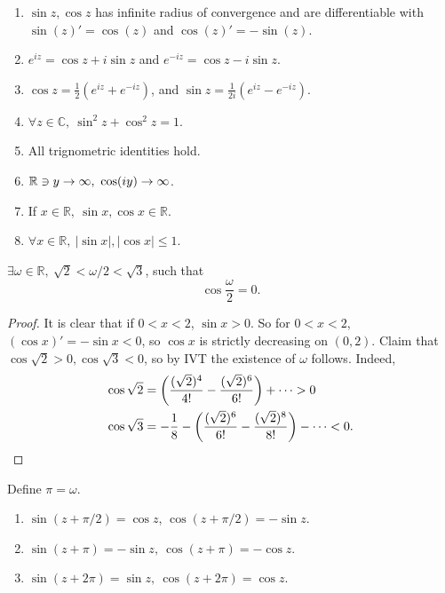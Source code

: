 \begin{sprop}
    \begin{enumerate}
        \item     $ \sin z,\cos z $ has infinite radius of convergence and are differentiable with $ \sin(z)'= \cos(z) $ and $ \cos(z)'=-\sin (z) $.
        \item $ e^{iz}=\cos z+i \sin z $ and $ e^{-iz}=\cos z-i \sin z $.
        \item $\displaystyle \cos z=\frac{1}{2}\left( e^{iz}+e^{-iz} \right)$, and $\displaystyle \sin z = \frac{1}{2i}\left( e^{iz}-e^{-iz} \right)$. 
        \item $\forall z\in \mathbb{C},\ \sin ^2 z+ \cos ^2 z=1 $.
        \item All trignometric identities hold.
        \item $ {\mathbb{R}}\ni y\to \infty,\ \cos(iy)\to \infty $.
        \item If $ x\in \mathbb{R},\ \sin x, \cos x\in \mathbb{R} $.
        \item $ \forall x\in \mathbb{R},\ |\sin x|,|\cos x|\le 1 $.
    \end{enumerate}
\end{sprop}

\begin{proposition}\label{prop:4.10}
    $ \exists \omega\in \mathbb{R},\ \sqrt{2}<\omega/2<\sqrt{3} $, such that 
    \[
        \cos \frac{\omega}{2}=0.
    \]
\end{proposition}
\begin{proof}
    It is clear that if $0<x<2$, $ \sin x>0 $. So for $0<x<2$, $ (\cos x)'=- \sin x<0 $, so $\cos x$ is strictly decreasing on $ (0,2) $. Claim that $ \cos \sqrt{2}>0, \cos \sqrt{3}<0 $, so by IVT the existence of $ \omega $ follows. Indeed, 
    \begin{align*}
        \cos \sqrt{2}&= \left( \frac{(\sqrt{2})^4}{4!}- \frac{(\sqrt{2})^6}{6!}\right)+\cdots>0\\ 
        \cos \sqrt{3}&= -\frac{1}{8}- \left( \frac{(\sqrt{2})^6}{6!}-\frac{(\sqrt{2})^8}{8!} \right)- \cdots <0.\qedhere
    \end{align*}
\end{proof}

\begin{definition}
    Define $ \pi=\omega $.
\end{definition}

\begin{theorem}\label{thm:4.12}
    \begin{enumerate}
        \item $ \sin (z+\pi/2)=\cos z $, $ \cos (z+\pi/2)=-\sin z $.
        \item $ \sin (z+\pi)=-\sin z,\ \cos (z+\pi)=-\cos z $.
        \item $ \sin (z+2\pi)=\sin z,\ \cos (z+2\pi)=\cos z $.
    \end{enumerate}
\end{theorem}

